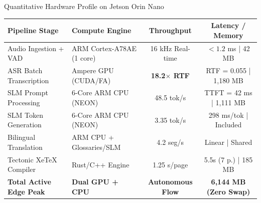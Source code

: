 \documentclass[aspectratio=169,10pt]{beamer}
\begin{document}
\begin{frame}{Quantitative Hardware Profile on Jetson Orin Nano}
  \begin{table}
    \footnotesize
    \begin{tabular}{llcc}
      \toprule
      \textbf{Pipeline Stage} & \textbf{Compute Engine} & \textbf{Throughput} & \textbf{Latency / Memory} \\
      \midrule
      Audio Ingestion + VAD   & ARM Cortex-A78AE (1 core)  & 16 kHz Real-time & $< 1.2$ ms | 42 MB \\
      ASR Batch Transcription & Ampere GPU (CUDA/FA)      & \textbf{18.2$\times$ RTF} & RTF = 0.055 | 1,180 MB \\
      SLM Prompt Processing   & 6-Core ARM CPU (NEON)     & 48.5 tok/s       & TTFT = 42 ms | 1,111 MB \\
      SLM Token Generation    & 6-Core ARM CPU (NEON)     & 3.35 tok/s       & 298 ms/tok | Included \\
      Bilingual Translation   & ARM CPU + Glossaries/SLM  & 4.2 seg/s        & Linear | Shared \\
      Tectonic XeTeX Compiler & Rust/C++ Engine           & 1.25 s/page      & 5.5s (7 p.) | 185 MB \\
      \midrule
      \textbf{Total Active Edge Peak} & \textbf{Dual GPU + CPU} & \textbf{Autonomous Flow} & \textbf{6,144 MB (Zero Swap)} \\
      \bottomrule
    \end{tabular}
  \end{table}
\end{frame}
\end{document}
